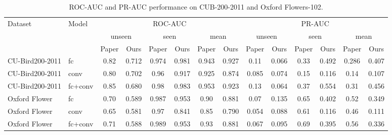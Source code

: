 \documentclass[11pt]{article}
\begin{document}
\begin{table}[t]
\centering
\scriptsize
\caption{ROC-AUC and PR-AUC performance on CUB-200-2011 and Oxford Flowers-102.}
\label{tab:table1}
\begin{tabular}{llcccccccccccc}
\toprule
Dataset & Model & \multicolumn{6}{c}{ROC-AUC} & \multicolumn{6}{c}{PR-AUC} \\
\cmidrule(lr){3-8} \cmidrule(lr){9-14}
 & & \multicolumn{2}{c}{unseen} & \multicolumn{2}{c}{seen} & \multicolumn{2}{c}{mean} & \multicolumn{2}{c}{unseen} & \multicolumn{2}{c}{seen} & \multicolumn{2}{c}{mean} \\
\cmidrule(lr){3-4} \cmidrule(lr){5-6} \cmidrule(lr){7-8} \cmidrule(lr){9-10} \cmidrule(lr){11-12} \cmidrule(lr){13-14}
 & & Paper & Ours & Paper & Ours & Paper & Ours & Paper & Ours & Paper & Ours & Paper & Ours \\
\midrule
CU-Bird200-2011 & fc & 0.82 & 0.712 & 0.974 & 0.981 & 0.943 & 0.927 & 0.11 & 0.066 & 0.33 & 0.492 & 0.286 & 0.407 \\
CU-Bird200-2011 & conv & 0.80 & 0.702 & 0.96 & 0.917 & 0.925 & 0.874 & 0.085 & 0.074 & 0.15 & 0.116 & 0.14 & 0.107 \\
CU-Bird200-2011 & fc+conv & 0.85 & 0.680 & 0.98 & 0.983 & 0.953 & 0.923 & 0.13 & 0.064 & 0.37 & 0.554 & 0.31 & 0.456 \\
Oxford Flower & fc & 0.70 & 0.589 & 0.987 & 0.953 & 0.90 & 0.881 & 0.07 & 0.135 & 0.65 & 0.402 & 0.52 & 0.349 \\
Oxford Flower & conv & 0.65 & 0.581 & 0.97 & 0.841 & 0.85 & 0.790 & 0.054 & 0.088 & 0.61 & 0.116 & 0.46 & 0.111 \\
Oxford Flower & fc+conv & 0.71 & 0.588 & 0.989 & 0.953 & 0.93 & 0.881 & 0.067 & 0.095 & 0.69 & 0.395 & 0.56 & 0.336 \\
 \bottomrule
\end{tabular}
\end{table}
\end{document}
